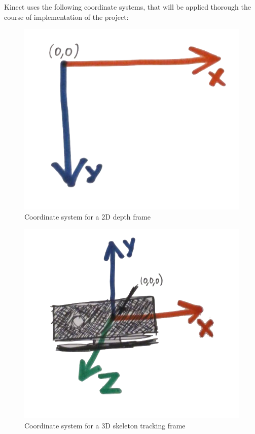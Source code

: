 \documentclass[a4paper,11pt,oneside]{article}
\begin{document}
Kinect uses the following coordinate systems, that will be applied thorough the course of implementation of the project:

\begin{figure}[H]
\centering
\includegraphics[scale=0.4]{coordinate-2d.png}
\caption{Coordinate system for a 2D depth frame}
\end{figure}

\begin{figure}[H]
\centering
\includegraphics[scale=0.3]{coordinate-3d.png}
\caption{Coordinate system for a 3D skeleton tracking frame}
\end{figure}
\end{document}
